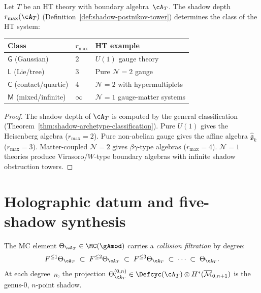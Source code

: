 \begin{corollary}
\label{cor:ht-shadow-archetype}
Let $T$ be an HT theory with boundary algebra~$\cA_T$. The shadow
depth~$r_{\max}(\cA_T)$
\textup{(}Definition~\textup{\ref{def:shadow-postnikov-tower}}\textup{)}
determines the class of the HT system:
\begin{center}
\renewcommand{\arraystretch}{1.2}
\begin{tabular}{lll}
\toprule
\textbf{Class} & $r_{\max}$ & \textbf{HT example} \\
\midrule
$\mathsf{G}$ (Gaussian) & $2$ & $U(1)$ gauge theory \\
$\mathsf{L}$ (Lie/tree) & $3$ & Pure $\mathcal{N}=2$ gauge \\
$\mathsf{C}$ (contact/quartic) & $4$ &
 $\mathcal{N}=2$ with hypermultiplets \\
$\mathsf{M}$ (mixed/infinite) & $\infty$ &
 $\mathcal{N}=1$ gauge-matter systems \\
\bottomrule
\end{tabular}
\end{center}
\end{corollary}

\begin{proof}
The shadow depth of $\cA_T$ is computed by the general
classification
(Theorem~\ref{thm:shadow-archetype-classification}).
Pure $U(1)$ gives the Heisenberg algebra ($r_{\max}=2$).
Pure non-abelian gauge gives the affine algebra
$\widehat{\mathfrak{g}}_k$ ($r_{\max}=3$).
Matter-coupled $\mathcal{N}=2$ gives $\beta\gamma$-type
algebras ($r_{\max}=4$). $\mathcal{N}=1$ theories produce
Virasoro/$W$-type boundary algebras with infinite shadow obstruction towers.
\end{proof}

\section{Holographic datum and five-shadow synthesis}
\label{sec:ht-holographic-datum}

\begin{definition}
\label{def:ht-collision-filtration}
The MC element $\Theta_{\cA_T} \in \MC(\gAmod)$ carries a
\emph{collision filtration} by degree:
\begin{equation}\label{eq:ht-collision-filtration}
F^{\leq 1} \Theta_{\cA_T}
\;\subset\; F^{\leq 2} \Theta_{\cA_T}
\;\subset\; F^{\leq 3} \Theta_{\cA_T}
\;\subset\; \cdots
\;\subset\; \Theta_{\cA_T}.
\end{equation}
At each degree~$n$, the projection
$\Theta_{\cA_T}^{(0,n)} \in
\Defcyc(\cA_T) \otimes H^*(\overline{\mathcal{M}}_{0,n+1})$
is the genus-$0$, $n$-point shadow.
\end{definition}

